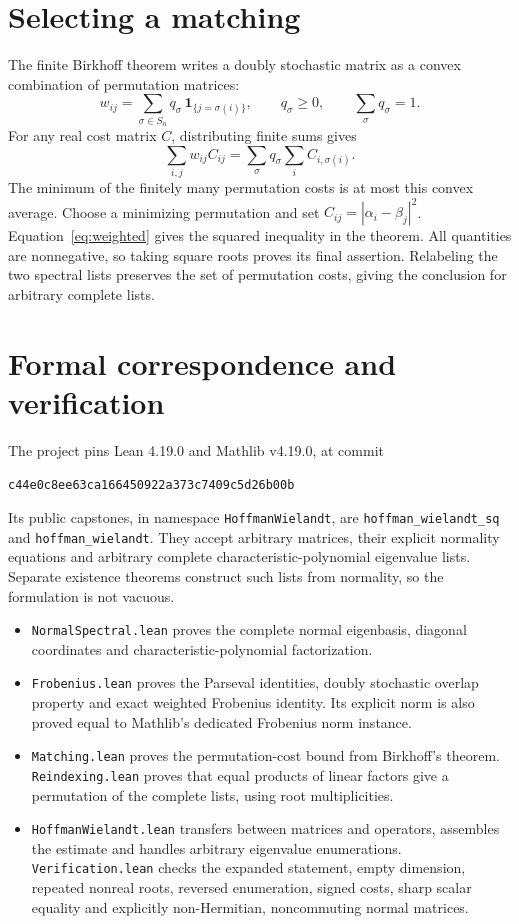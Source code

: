 \documentclass[11pt]{article}
\begin{document}
\section{Selecting a matching}
The finite Birkhoff theorem writes a doubly stochastic matrix as a convex
combination of permutation matrices:
\[
 w_{ij}=\sum_{\sigma\in S_n}q_\sigma\,
       \mathbf1_{\{j=\sigma(i)\}},
 \qquad q_\sigma\geq0,\qquad\sum_\sigma q_\sigma=1.
\]
For any real cost matrix $C$, distributing finite sums gives
\[
 \sum_{i,j}w_{ij}C_{ij}
 =\sum_\sigma q_\sigma\sum_i C_{i,\sigma(i)}.
\]
The minimum of the finitely many permutation costs is at most this convex
average. Choose a minimizing permutation and set
$C_{ij}=|\alpha_i-\beta_j|^2$. Equation~\eqref{eq:weighted} gives the squared
inequality in the theorem. All quantities are nonnegative, so taking square
roots proves its final assertion. Relabeling the two spectral lists preserves
the set of permutation costs, giving the conclusion for arbitrary complete
lists.

\section{Formal correspondence and verification}
The project pins Lean 4.19.0 and Mathlib v4.19.0, at commit
\begin{center}\small\texttt{c44e0c8ee63ca166450922a373c7409c5d26b00b}\end{center}
{\raggedright Its public capstones,
in namespace \texttt{HoffmanWielandt}, are
\texttt{hoffman\_wielandt\_sq} and \texttt{hoffman\_wielandt}. They accept
arbitrary matrices, their explicit normality equations and arbitrary complete
characteristic-polynomial eigenvalue lists. Separate existence theorems
construct such lists from normality, so the formulation is not vacuous.\par}

\begin{itemize}\raggedright
\item \texttt{NormalSpectral.lean} proves the complete normal eigenbasis,
diagonal coordinates and characteristic-polynomial factorization.
\item \texttt{Frobenius.lean} proves the Parseval identities, doubly stochastic
overlap property and exact weighted Frobenius identity. Its explicit norm is
also proved equal to Mathlib's dedicated Frobenius norm instance.
\item \texttt{Matching.lean} proves the permutation-cost bound from Birkhoff's
theorem. \texttt{Reindexing.lean} proves that equal products of linear factors
give a permutation of the complete lists, using root multiplicities.
\item \texttt{HoffmanWielandt.lean} transfers between matrices and operators,
assembles the estimate and handles arbitrary eigenvalue enumerations.
\texttt{Verification.lean} checks the expanded statement, empty dimension,
repeated nonreal roots, reversed enumeration, signed costs, sharp scalar
equality and explicitly non-Hermitian, noncommuting normal matrices.
\end{itemize}
\end{document}
